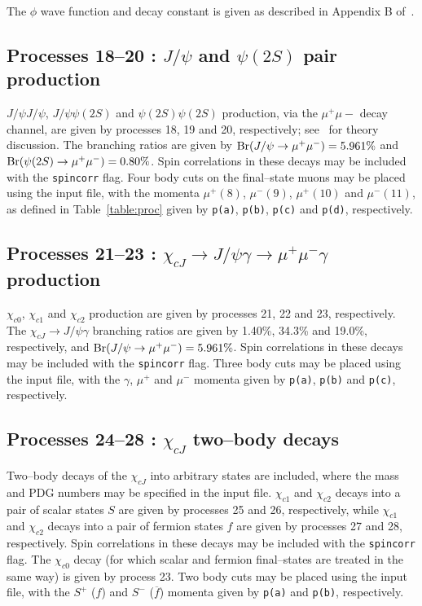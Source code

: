 \documentclass[12pt]{article}
\begin{document}
The $\phi$ wave function and decay constant is given as described in Appendix B of~\cite{Harland-Lang:2014efa}.

\subsection{Processes 18--20 : $J/\psi$ and $\psi(2S)$ pair production}

$J/\psi J/\psi$, $J/\psi\psi(2S)$ and $\psi(2S)\psi(2S)$ production, via the $\mu^+\mu-$ decay channel, are given by processes 18, 19 and 20, 
respectively; see~\cite{Harland-Lang:2014efa} for theory discussion. The branching ratios are given by ${\rm Br}(J/\psi \to \mu^+\mu^-)=5.961\%$ 
and ${\rm Br}(\psi(2S) \to \mu^+\mu^-)=0.80\%$. Spin correlations in these decays may be included with the \texttt{spincorr} flag. Four body cuts 
on the final--state muons may be placed using the input file, with the momenta $\mu^+(8)$, $\mu^-(9)$, $\mu^+(10)$ and $\mu^-(11)$, as defined in 
Table~\ref{table:proc} given by \texttt{p(a)}, \texttt{p(b)}, \texttt{p(c)} and \texttt{p(d)}, respectively.

\subsection{Processes 21--23 : $\chi_{cJ}\to J/\psi\gamma\to \mu^+\mu^-\gamma$ production}

$\chi_{c0}$, $\chi_{c1}$ and $\chi_{c2}$ production are given by processes 21, 22 and 23, respectively. The $\chi_{cJ}\to J/\psi \gamma$ branching 
ratios are given by 1.40\%, 34.3\% and 19.0\%, respectively, and ${\rm Br}(J/\psi \to \mu^+\mu^-)=5.961\%$. Spin correlations in these decays may 
be included with the \texttt{spincorr} flag. Three body cuts may be placed using the input file, with the $\gamma$, $\mu^+$ and $\mu^-$ momenta 
given by \texttt{p(a)}, \texttt{p(b)} and \texttt{p(c)}, respectively.

\subsection{Processes 24--28 : $\chi_{cJ}$ two--body decays}

Two--body decays of the $\chi_{cJ}$ into arbitrary states are included, where the mass and PDG numbers may be specified in the input file. 
$\chi_{c1}$ and $\chi_{c2}$ decays into a pair of scalar states $S$ are given by processes 25 and 26, respectively, while $\chi_{c1}$ and 
$\chi_{c2}$ decays into a pair of fermion states $f$ are given by processes 27 and 28, respectively. Spin correlations in these decays may be 
included with the \texttt{spincorr} flag.  The $\chi_{c0}$ decay (for which scalar and fermion final--states are treated in the same way) is 
given by process 23. Two body cuts may be placed using the input file, with the $S^+$ ($f$) and $S^-$ ($\overline{f}$) momenta given by \texttt{p(a)} 
and \texttt{p(b)}, respectively.
\end{document}
